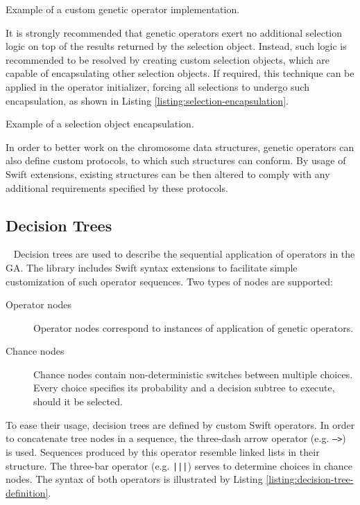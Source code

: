 \begin{listing}[ht]
	\caption{Example of a custom genetic operator implementation.}
	\label{listing:custom-operator}
\end{listing}

It is strongly recommended that genetic operators exert no additional selection logic on top of the results returned by the selection object. Instead, such logic is recommended to be resolved by creating custom selection objects, which are capable of encapsulating other selection objects. If required, this technique can be applied in the operator initializer, forcing all selections to undergo such encapsulation, as shown in Listing \ref{listing:selection-encapsulation}.

\begin{listing}[ht]
	\caption{Example of a selection object encapsulation.}
	\label{listing:selection-encapsulation}
\end{listing}

In order to better work on the chromosome data structures, genetic operators can also define custom protocols, to which such structures can conform. By usage of Swift extensions, existing structures can be then altered to comply with any additional requirements specified by these protocols.

\subsection{Decision Trees}~\label{section:decision-trees}
Decision trees are used to describe the sequential application of operators in the GA. The library includes Swift syntax extensions to facilitate simple customization of such operator sequences. Two types of nodes are supported:
~
\begin{description}
	\item[Operator nodes]
	Operator nodes correspond to instances of application of genetic operators.

	\item[Chance nodes]
	Chance nodes contain non-deterministic switches between multiple choices. Every choice specifies its probability and a decision subtree to execute, should it be selected.
\end{description}

To ease their usage, decision trees are defined by custom Swift operators. In order to concatenate tree nodes in a sequence, the three-dash arrow operator (e.g. \texttt{--->}) is used. Sequences produced by this operator resemble linked lists in their structure. The three-bar operator (e.g. \texttt{|||}) serves to determine choices in chance nodes. The syntax of both operators is illustrated by Listing \ref{listing:decision-tree-definition}.

